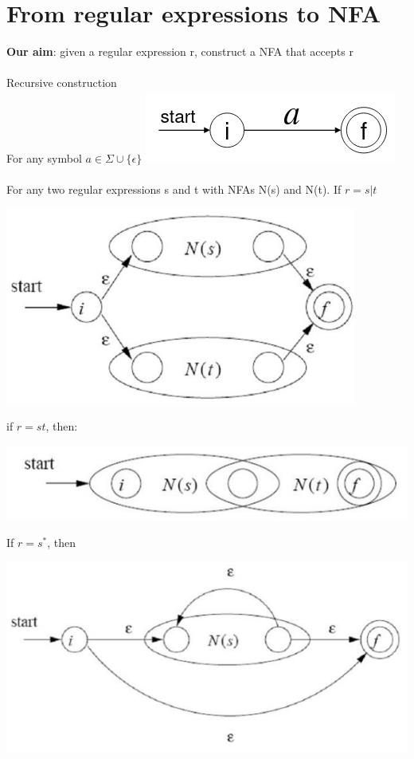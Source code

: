 \documentclass{article}[18pt]
\begin{document}
\section{From regular expressions to NFA}
\textbf{Our aim}: given a regular expression r, construct a NFA that accepts r\\
\\
Recursive construction\\
For any symbol $a\in \Sigma \cup \{\epsilon\}$ 
\includegraphics[scale=0.6]{recusrive}\\
\\
For any two regular expressions s and t with NFAs N(s) and N(t).
\newpage
If $r=s|t$
\begin{center}
	\includegraphics[scale=0.7]{"Two Regular Expressions"}
\end{center}
if $r=st$, then:
\begin{center}
	\includegraphics[scale=0.7]{r=st}
\end{center}
If $r=s^*$, then
\begin{center}
	\includegraphics[scale=0.7]{r=s*}
\end{center}
\end{document}
